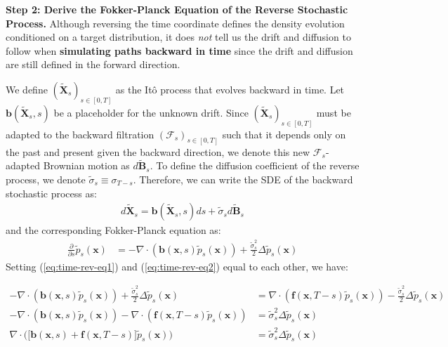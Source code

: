 \documentclass{article}
\begin{document}
\textbf{Step 2: Derive the Fokker-Planck Equation of the Reverse Stochastic Process.} 
Although reversing the time coordinate defines the density evolution conditioned on a target distribution, it does \textit{not} tell us the drift and diffusion to follow when \textbf{simulating paths backward in time} since the drift and diffusion are still defined in the forward direction.  

We define $(\tilde{\boldsymbol{X}}_s)_{s\in [0,T]}$ as the Itô process that evolves backward in time. Let $\boldsymbol{b}(\tilde{\boldsymbol{X}}_s, s)$ be a placeholder for the unknown drift. Since $(\tilde{\boldsymbol{X}}_s)_{s\in [0,T]}$ must be adapted to the backward filtration $(\mathcal{F}_s)_{s\in [0,T]}$ such that it depends only on the past and present given the backward direction, we denote this new $\mathcal{F}_s$-adapted Brownian motion as $d\widetilde{\boldsymbol{B}}_s$. To define the diffusion coefficient of the reverse process, we denote $\tilde{\sigma}_s\equiv\sigma_{T-s}$. Therefore, we can write the SDE of the backward stochastic process as: 
\begin{align}
    d\tilde{\boldsymbol{X}}_s=\boldsymbol{b}(\tilde{\boldsymbol{X}}_s,s)ds+\tilde{\sigma}_sd\widetilde{\boldsymbol{B}}_s
\end{align}
and the corresponding Fokker-Planck equation as:
\begin{align}
    \frac{\partial}{\partial s}\tilde{p}_s(\boldsymbol{x})&=-\nabla\cdot(\boldsymbol{b}(\boldsymbol{x},s)\tilde{p}_s(\boldsymbol{x}))+\frac{\tilde{\sigma}_s^2}{2}\Delta \tilde{p}_s(\boldsymbol{x})\label{eq:time-rev-eq1}
\end{align}
Setting (\ref{eq:time-rev-eq1}) and (\ref{eq:time-rev-eq2}) equal to each other, we have:
\begin{small}
\begin{align}
    -\nabla\cdot(\boldsymbol{b}(\boldsymbol{x},s)\tilde{p}_s(\boldsymbol{x}))+\frac{\tilde{\sigma}_s^2}{2}\Delta \tilde{p}_s(\boldsymbol{x}) &=\nabla\cdot (\boldsymbol{f}(\boldsymbol{x},T-s) \tilde{p}_s(\boldsymbol{x}))-\frac{\tilde{\sigma}_s^2}{2}\Delta \tilde{p}_s(\boldsymbol{x})\nonumber\\
    -\nabla\cdot(\boldsymbol{b}(\boldsymbol{x},s)\tilde{p}_s(\boldsymbol{x}))-\nabla\cdot (\boldsymbol{f}(\boldsymbol{x},T-s) \tilde{p}_s(\boldsymbol{x}))&=\tilde{\sigma}_s^2\Delta \tilde{p}_s(\boldsymbol{x})\nonumber\\
    \nabla\cdot \bigg(\big[\boldsymbol{b}(\boldsymbol{x},s)+\boldsymbol{f}(\boldsymbol{x},T-s)\big] \tilde{p}_s(\boldsymbol{x})\bigg)&=\tilde{\sigma}_s^2\Delta \tilde{p}_s(\boldsymbol{x})
\end{align}
\end{small}
\end{document}
